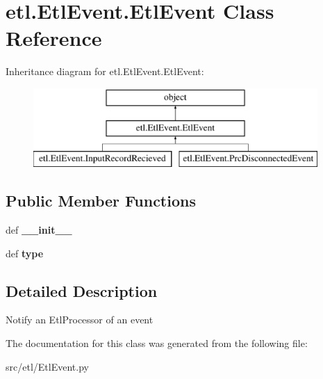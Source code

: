 \hypertarget{classetl_1_1EtlEvent_1_1EtlEvent}{\section{etl.\-Etl\-Event.\-Etl\-Event Class Reference}
\label{classetl_1_1EtlEvent_1_1EtlEvent}
}
Inheritance diagram for etl.\-Etl\-Event.\-Etl\-Event\-:\begin{figure}[H]
\begin{center}
\leavevmode
\includegraphics[height=3.000000cm]{classetl_1_1EtlEvent_1_1EtlEvent}
\end{center}
\end{figure}
\subsection*{Public Member Functions}
\begin{DoxyCompactItemize}
\item 
\hypertarget{classetl_1_1EtlEvent_1_1EtlEvent_a24f35282adb8d1d2d8b25a6bb06df3e8}{def {\bfseries \-\_\-\-\_\-init\-\_\-\-\_\-}}\label{classetl_1_1EtlEvent_1_1EtlEvent_a24f35282adb8d1d2d8b25a6bb06df3e8}

\item 
\hypertarget{classetl_1_1EtlEvent_1_1EtlEvent_a396c56109a4dc37ba40127a5dd1e5265}{def {\bfseries type}}\label{classetl_1_1EtlEvent_1_1EtlEvent_a396c56109a4dc37ba40127a5dd1e5265}

\end{DoxyCompactItemize}


\subsection{Detailed Description}
\begin{DoxyVerb}Notify an EtlProcessor of an event\end{DoxyVerb}
 

The documentation for this class was generated from the following file\-:\begin{DoxyCompactItemize}
\item 
src/etl/Etl\-Event.\-py\end{DoxyCompactItemize}
